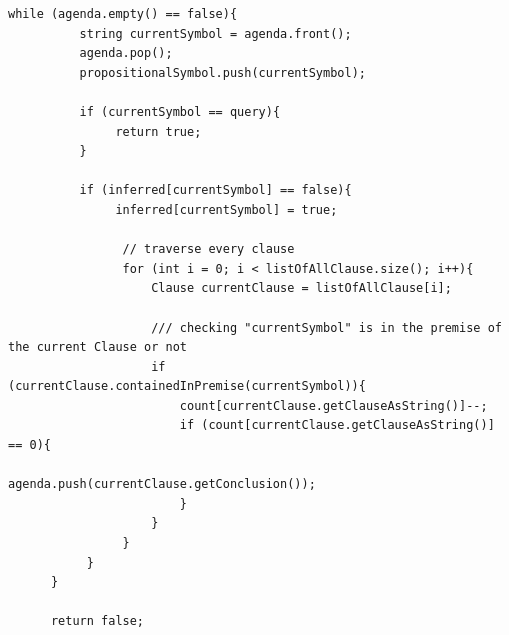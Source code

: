 \documentclass{assignment}
\begin{document}
\lstset{language=C++}
\begin{lstlisting}[caption={Checking the queue/agenda}]
	while (agenda.empty() == false){
          string currentSymbol = agenda.front();
          agenda.pop();
          propositionalSymbol.push(currentSymbol);

          if (currentSymbol == query){
               return true;
          }

          if (inferred[currentSymbol] == false){
               inferred[currentSymbol] = true;

            	// traverse every clause
                for (int i = 0; i < listOfAllClause.size(); i++){
                    Clause currentClause = listOfAllClause[i];

                    /// checking "currentSymbol" is in the premise of the current Clause or not
                    if (currentClause.containedInPremise(currentSymbol)){
                        count[currentClause.getClauseAsString()]--;
                        if (count[currentClause.getClauseAsString()] == 0){
                            agenda.push(currentClause.getConclusion());
                        }
                    } 
                }
           }
      }
            
      return false;
\end{lstlisting}
\end{document}
